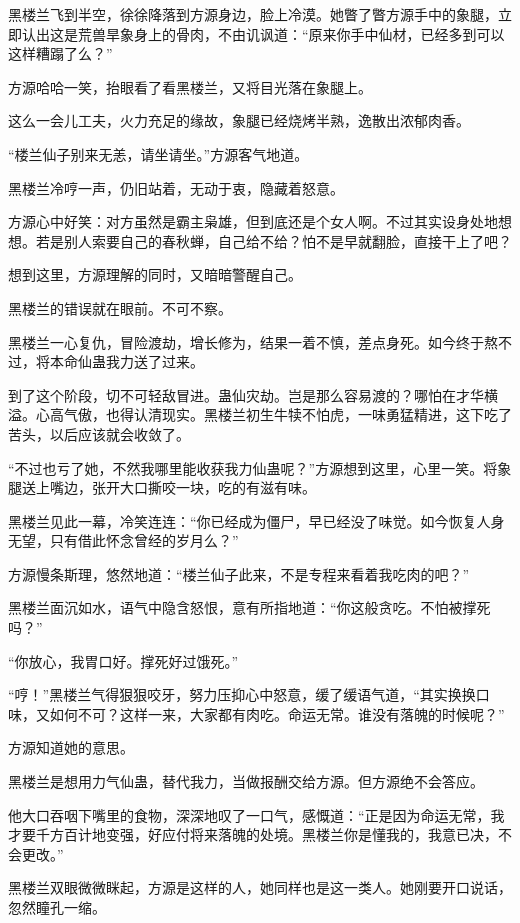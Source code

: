 \begin{this_body}
黑楼兰飞到半空，徐徐降落到方源身边，脸上冷漠。她瞥了瞥方源手中的象腿，立即认出这是荒兽旱象身上的骨肉，不由讥讽道：“原来你手中仙材，已经多到可以这样糟蹋了么？”

方源哈哈一笑，抬眼看了看黑楼兰，又将目光落在象腿上。

这么一会儿工夫，火力充足的缘故，象腿已经烧烤半熟，逸散出浓郁肉香。

“楼兰仙子别来无恙，请坐请坐。”方源客气地道。

黑楼兰冷哼一声，仍旧站着，无动于衷，隐藏着怒意。

方源心中好笑：对方虽然是霸主枭雄，但到底还是个女人啊。不过其实设身处地想想。若是别人索要自己的春秋蝉，自己给不给？怕不是早就翻脸，直接干上了吧？

想到这里，方源理解的同时，又暗暗警醒自己。

黑楼兰的错误就在眼前。不可不察。

黑楼兰一心复仇，冒险渡劫，增长修为，结果一着不慎，差点身死。如今终于熬不过，将本命仙蛊我力送了过来。

到了这个阶段，切不可轻敌冒进。蛊仙灾劫。岂是那么容易渡的？哪怕在才华横溢。心高气傲，也得认清现实。黑楼兰初生牛犊不怕虎，一味勇猛精进，这下吃了苦头，以后应该就会收敛了。

“不过也亏了她，不然我哪里能收获我力仙蛊呢？”方源想到这里，心里一笑。将象腿送上嘴边，张开大口撕咬一块，吃的有滋有味。

黑楼兰见此一幕，冷笑连连：“你已经成为僵尸，早已经没了味觉。如今恢复人身无望，只有借此怀念曾经的岁月么？”

方源慢条斯理，悠然地道：“楼兰仙子此来，不是专程来看着我吃肉的吧？”

黑楼兰面沉如水，语气中隐含怒恨，意有所指地道：“你这般贪吃。不怕被撑死吗？”

“你放心，我胃口好。撑死好过饿死。”

“哼！”黑楼兰气得狠狠咬牙，努力压抑心中怒意，缓了缓语气道，“其实换换口味，又如何不可？这样一来，大家都有肉吃。命运无常。谁没有落魄的时候呢？”

方源知道她的意思。

黑楼兰是想用力气仙蛊，替代我力，当做报酬交给方源。但方源绝不会答应。

他大口吞咽下嘴里的食物，深深地叹了一口气，感慨道：“正是因为命运无常，我才要千方百计地变强，好应付将来落魄的处境。黑楼兰你是懂我的，我意已决，不会更改。”

黑楼兰双眼微微眯起，方源是这样的人，她同样也是这一类人。她刚要开口说话，忽然瞳孔一缩。


\end{this_body}
